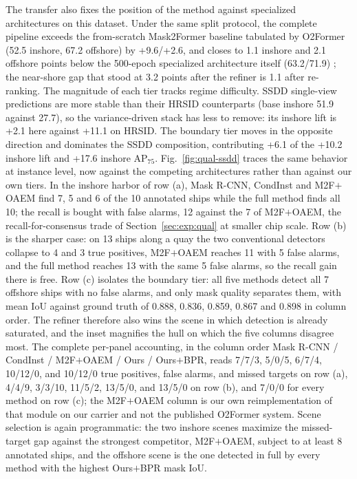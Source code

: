 The transfer also fixes the position of the method against specialized architectures on this dataset. Under the same split protocol, the complete pipeline exceeds the from-scratch Mask2Former baseline tabulated by O2Former (52.5 inshore, 67.2 offshore) by +9.6/+2.6, and closes to 1.1 inshore and 2.1 offshore points below the 500-epoch specialized architecture itself (63.2/71.9) \cite{o2former2025}; the near-shore gap that stood at 3.2 points after the refiner is 1.1 after re-ranking. The magnitude of each tier tracks regime difficulty. SSDD single-view predictions are more stable than their HRSID counterparts (base inshore 51.9 against 27.7), so the variance-driven stack has less to remove: its inshore lift is +2.1 here against +11.1 on HRSID. The boundary tier moves in the opposite direction and dominates the SSDD composition, contributing +6.1 of the +10.2 inshore lift and +17.6 inshore AP$_{75}$. Fig.~\ref{fig:qual-ssdd} traces the same behavior at instance level, now against the competing architectures rather than against our own tiers. In the inshore harbor of row (a), Mask R-CNN, CondInst and M2F$+$OAEM find 7, 5 and 6 of the 10 annotated ships while the full method finds all 10; the recall is bought with false alarms, 12 against the 7 of M2F$+$OAEM, the recall-for-consensus trade of Section~\ref{sec:exp:qual} at smaller chip scale. Row (b) is the sharper case: on 13 ships along a quay the two conventional detectors collapse to 4 and 3 true positives, M2F$+$OAEM reaches 11 with 5 false alarms, and the full method reaches 13 with the same 5 false alarms, so the recall gain there is free. Row (c) isolates the boundary tier: all five methods detect all 7 offshore ships with no false alarms, and only mask quality separates them, with mean IoU against ground truth of 0.888, 0.836, 0.859, 0.867 and 0.898 in column order. The refiner therefore also wins the scene in which detection is already saturated, and the inset magnifies the hull on which the five columns disagree most. The complete per-panel accounting, in the column order Mask R-CNN / CondInst / M2F$+$OAEM / Ours / Ours$+$BPR, reads 7/7/3, 5/0/5, 6/7/4, 10/12/0, and 10/12/0 true positives, false alarms, and missed targets on row (a), 4/4/9, 3/3/10, 11/5/2, 13/5/0, and 13/5/0 on row (b), and 7/0/0 for every method on row (c); the M2F$+$OAEM column is our own reimplementation of that module on our carrier and not the published O2Former system. Scene selection is again programmatic: the two inshore scenes maximize the missed-target gap against the strongest competitor, M2F$+$OAEM, subject to at least 8 annotated ships, and the offshore scene is the one detected in full by every method with the highest Ours$+$BPR mask IoU.

